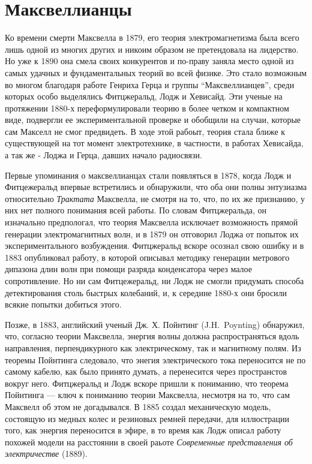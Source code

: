 \documentclass[12pt, oneside, a4paper]{article}
\begin{document}
\section*{Максвеллианцы}
Ко времени смерти Максвелла в 1879, его теория электромагнетизма была всего лишь одной из многих других и никоим образом не претендовала на лидерство. Но уже к 1890 она смела своих конкурентов и по-праву заняла место одной из самых удачных и фундаментальных теорий во всей физике. Это стало возможным во многом благодаря работе Генриха Герца и группы ``Максвеллианцев'', среди которых особо выделялись Фитцжеральд, Лодж и Хевисайд. Эти ученые на протяжении 1880-х переформулировали теорию в более четком и компактном виде, подвергли ее экспериментальной проверке  и обобщили на случаи, которые сам Макселл не смог предвидеть. В ходе этой рабоыт, теория стала ближе к существующей на тот момент электротехнике, в частности, в работах Хевисайда, а так же - Лоджа и Герца, давших начало радиосвязи.

Первые упоминания о максвеллианцах стали появляться в 1878, когда Лодж и Фитцежеральд впервые встретились и обнаружили, что оба они полны энтузиазма относительно \emph{Трактата} Максвелла, не смотря на то, что, по их же признанию, у них нет полного понимания всей работы. По словам Фитцжеральда, он изначально предпологал, что теория Максвелла исключает возможность прямой генерации электромагнитных волн, и в 1879 он отговорил Лоджа от попыток их экспериментального возбуждения. Фитцжеральд вскоре осознал свою ошибку и в 1883 опубликовал работу, в которой описывал методику генерации метрового дипазона длин волн при помощи разряда конденсатора через малое сопротивление. Но ни сам Фитцежеральд, ни Лодж не смогли придумать способа детектирования столь быстрых колебаний, и, к середине 1880-х они бросили всякие попытки добиться этого.

Позже, в 1883, английский ученый Дж. Х. Пойнтинг (J.H.~Poynting) обнаружил, что, согласно теории Максвелла, энергия волны должна распространяться вдоль направления, перпендикурного как электрическому, так и магнитному полям. Из теоремы Пойнтинга следовало, что энегия электрического тока переносится не по самому кабелю, как было принято думать, а перенесится через пространстов вокруг него. Фитцжеральд и Лодж вскоре пришли к пониманию, что теорема Пойнтинга --- ключ к пониманию теории Максвелла, несмотря на то, что сам Максвелл об этом не догадывался. В 1885 создал механическую модель, состоящую из медных колес и резиновых ремней передачи, для иллюстрации того, как энергия переносится в эфире, в то время как Лодж описал работу похожей модели на расстоянии в своей раьоте \emph{Современные представления об электричестве} (1889).
\end{document}
